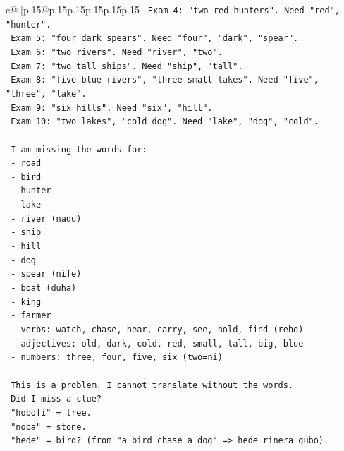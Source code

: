 \documentclass{article}
\begin{document}
{\begin{supertabular}{c@{$\;$}|p{.15\linewidth}@{}p{.15\linewidth}p{.15\linewidth}p{.15\linewidth}p{.15\linewidth}p{.15\linewidth}}
{{{\texttt{        Exam 4: "two red hunters". Need "red", "hunter".} \\
\texttt{        Exam 5: "four dark spears". Need "four", "dark", "spear".} \\
\texttt{        Exam 6: "two rivers". Need "river", "two".} \\
\texttt{        Exam 7: "two tall ships". Need "ship", "tall".} \\
\texttt{        Exam 8: "five blue rivers", "three small lakes". Need "five", "three", "lake".} \\
\texttt{        Exam 9: "six hills". Need "six", "hill".} \\
\texttt{        Exam 10: "two lakes", "cold dog". Need "lake", "dog", "cold".} \\
\\ 
\texttt{        I am missing the words for:} \\
\texttt{        {-} road} \\
\texttt{        {-} bird} \\
\texttt{        {-} hunter} \\
\texttt{        {-} lake} \\
\texttt{        {-} river (nadu)} \\
\texttt{        {-} ship} \\
\texttt{        {-} hill} \\
\texttt{        {-} dog} \\
\texttt{        {-} spear (nife)} \\
\texttt{        {-} boat (duha)} \\
\texttt{        {-} king} \\
\texttt{        {-} farmer} \\
\texttt{        {-} verbs: watch, chase, hear, carry, see, hold, find (reho)} \\
\texttt{        {-} adjectives: old, dark, cold, red, small, tall, big, blue} \\
\texttt{        {-} numbers: three, four, five, six (two=ni)} \\
\\ 
\texttt{        This is a problem. I cannot translate without the words.} \\
\texttt{        Did I miss a clue?} \\
\texttt{        "hobofi" = tree.} \\
\texttt{        "noba" = stone.} \\
\texttt{        "hede" = bird? (from "a bird chase a dog" => hede rinera gubo).} \\
}}}
\end{supertabular}}
\end{document}
